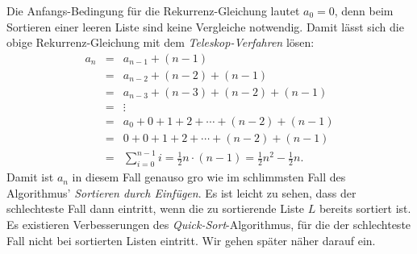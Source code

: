Die Anfangs-Bedingung f\"ur die Rekurrenz-Gleichung lautet $a_0 = 0$, denn beim Sortieren einer leeren Liste sind keine
Vergleiche notwendig.  Damit l\"asst sich die obige Rekurrenz-Gleichung mit dem \emph{Teleskop-Verfahren} l\"osen:
\[
\begin{array}{lcl}
  a_n & = & a_{n-1} + (n-1) \\
      & = & a_{n-2} + (n-2) + (n-1) \\
      & = & a_{n-3} + (n-3) + (n-2) + (n-1) \\
      & = & \vdots \\
      & = & a_{0} + 0 + 1 + 2 + \cdots  + (n-2) + (n-1) \\
      & = & 0 + 0 + 1 + 2 + \cdots  + (n-2) + (n-1) \\[0.1cm]
      & = & \sum\limits_{i=0}^{n-1} i  =  \frac{1}{2} n \cdot(n - 1) =\frac{1}{2} n^2 - \frac{1}{2} n.
\end{array}
\]
Damit ist $a_n$ in diesem Fall genauso gro\3 wie im schlimmsten Fall des Algorithmus' \emph{Sortieren durch Einf\"ugen}.
Es ist leicht zu sehen, dass der schlechteste Fall dann eintritt, wenn die zu sortierende Liste $L$
bereits sortiert ist.  Es existieren Verbesserungen des \emph{Quick-Sort}-Algorithmus, f\"ur
die der schlechteste Fall nicht bei sortierten Listen eintritt.  Wir gehen sp\"ater n\"aher darauf ein.

